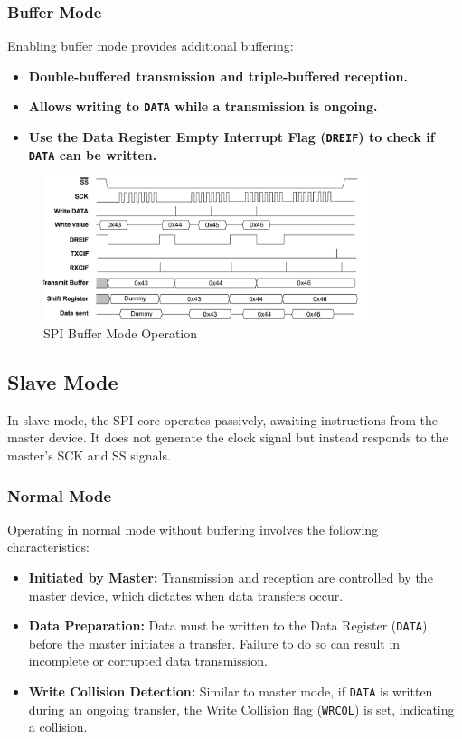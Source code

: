 \documentclass{article}
\begin{document}
\subsubsection{Buffer Mode}
Enabling buffer mode provides additional buffering:

\begin{itemize}
    \item \textbf{Double-buffered transmission and triple-buffered reception.}
    \item \textbf{Allows writing to \texttt{DATA} while a transmission is ongoing.}
    \item \textbf{Use the Data Register Empty Interrupt Flag (\texttt{DREIF}) to check if \texttt{DATA} can be written.}
\end{itemize}

\begin{figure}[H]
    \centering
    \includegraphics[width=0.85\textwidth]{images/spi_buffer_mode.png}
    \caption{SPI Buffer Mode Operation}
    \label{fig:spi_buffer_mode}
\end{figure}

\subsection{Slave Mode}
In slave mode, the SPI core operates passively, awaiting instructions from the master device. It does not generate the clock signal but instead responds to the master's SCK and SS signals.

\subsubsection{Normal Mode}
Operating in normal mode without buffering involves the following characteristics:

\begin{itemize}
    \item \textbf{Initiated by Master:} Transmission and reception are controlled by the master device, which dictates when data transfers occur.
    \item \textbf{Data Preparation:} Data must be written to the Data Register (\texttt{DATA}) before the master initiates a transfer. Failure to do so can result in incomplete or corrupted data transmission.
    \item \textbf{Write Collision Detection:} Similar to master mode, if \texttt{DATA} is written during an ongoing transfer, the Write Collision flag (\texttt{WRCOL}) is set, indicating a collision.
\end{itemize}
\end{document}
